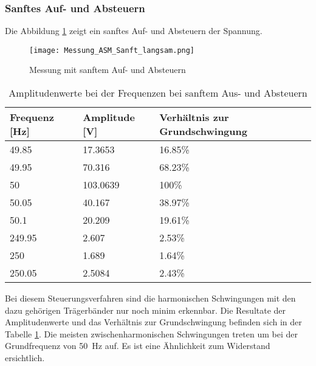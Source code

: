 \subsubsection*{Sanftes Auf- und Absteuern}

Die Abbildung \ref{fig:Mess_ASM_Sanft_langsam} zeigt ein sanftes Auf- und Absteuern der Spannung.

\begin{figure}[ht!]
	\centering
	\texttt{[image: Messung\_ASM\_Sanft\_langsam.png]}	
	\caption{Messung mit sanftem Auf- und Absteuern}\label{fig:Mess_ASM_Sanft_langsam}
\end{figure}


\begin{table}[ht!]
	\centering
	\begin{tabular}{|l|l|l|}
		\hline
		Frequenz {[}Hz{]} & Amplitude {[}V{]} & Verhältnis zur Grundschwingung \\ \hline
		49.85             & 17.3653           & 16.85\%                        \\ \hline
		49.95             & 70.316            & 68.23\%                        \\ \hline
		50                & 103.0639          & 100\%                          \\ \hline
		50.05             & 40.167            & 38.97\%                        \\ \hline
		50.1              & 20.209            & 19.61\%                        \\ \hline
		249.95            & 2.607             & 2.53\%                         \\ \hline
		250               & 1.689             & 1.64\%                         \\ \hline
		250.05            & 2.5084            & 2.43\%                         \\ \hline
	\end{tabular}
\caption{Amplitudenwerte bei der Frequenzen bei sanftem Aus- und Absteuern}\label{tab:Mess_Spannung_ASM_AufAb_sanft}
\end{table}


Bei diesem Steuerungsverfahren sind die harmonischen Schwingungen mit den dazu gehörigen Trägerbänder nur noch minim erkennbar. Die Resultate der Amplitudenwerte und das Verhältnis zur Grundschwingung befinden sich in der Tabelle \ref{tab:Mess_Spannung_ASM_AufAb_sanft}. Die meisten zwischenharmonischen Schwingungen treten um bei der Grundfrequenz von \SI{50}{Hz} auf. Es ist eine Ähnlichkeit zum Widerstand ersichtlich.



